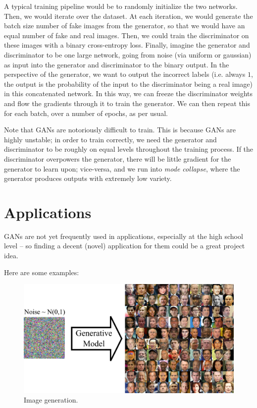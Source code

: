 \documentclass{article}
\begin{document}
    A typical training pipeline would be to randomly initialize the two networks. Then, we would iterate over the dataset. At each iteration, we would generate the batch size number of fake images from the generator, so that we would have an equal number of fake and real images. Then, we could train the discriminator on these images with a binary cross-entropy loss. Finally, imagine the generator and discriminator to be one large network, going from noise (via uniform or gaussian) as input into the generator and discriminator to the binary output. In the perspective of the generator, we want to output the incorrect labels (i.e. always $1$, the output is the probability of the input to the discriminator being a real image) in this concatenated network. In this way, we can freeze the discriminator weights and flow the gradients through it to train the generator. We can then repeat this for each batch, over a number of epochs, as per usual.
    
    Note that GANs are notoriously difficult to train. This is because GANs are highly unstable; in order to train correctly, we need the generator and discriminator to be roughly on equal levels throughout the training process. If the discriminator overpowers the generator, there will be little gradient for the generator to learn upon; vice-versa, and we run into \textit{mode collapse}, where the generator produces outputs with extremely low variety.
    

\section{Applications}
    GANs are not yet frequently used in applications, especially at the high school level -- so finding a decent (novel) application for them could be a great project idea.
    
    Here are some examples:

    \begin{figure}[H]
        \centerline{\includegraphics[scale=0.3]{image_generation.png}}
        \caption{Image generation.}
        \label{fig:image_generation}
    \end{figure}
    
\end{document}
